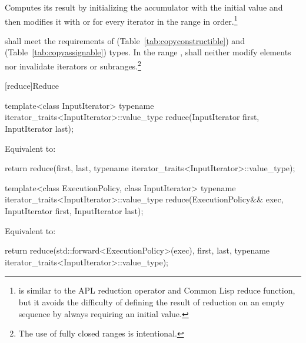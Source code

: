 \begin{itemdescr}
\pnum
\effects
Computes its result by initializing the accumulator
with the initial value
and then modifies it with
or
for every iterator
in the range 
in order.\footnote{
is similar to the APL reduction operator and Common Lisp reduce function, but
it avoids the difficulty of defining the result of reduction on an empty
sequence by always requiring an initial value.}

\pnum
\requires
{} shall meet the requirements of  (Table~\ref{tab:copyconstructible})
and  (Table~\ref{tab:copyassignable}) types.
In the range
,
shall neither modify elements nor invalidate iterators or subranges.\footnote{The use of fully closed ranges is intentional.}
\end{itemdescr}

[reduce]{Reduce}

%
\begin{itemdecl}
template<class InputIterator>
  typename iterator_traits<InputIterator>::value_type
    reduce(InputIterator first, InputIterator last);
\end{itemdecl}

\begin{itemdescr}
\pnum
\effects Equivalent to:
\begin{codeblock}
return reduce(first, last,
              typename iterator_traits<InputIterator>::value_type{});
\end{codeblock}
\end{itemdescr}

%
\begin{itemdecl}
template<class ExecutionPolicy, class InputIterator>
  typename iterator_traits<InputIterator>::value_type
    reduce(ExecutionPolicy&& exec,
           InputIterator first, InputIterator last);
\end{itemdecl}

\begin{itemdescr}
\pnum
\effects Equivalent to:
\begin{codeblock}
return reduce(std::forward<ExecutionPolicy>(exec), first, last,
              typename iterator_traits<InputIterator>::value_type{});
\end{codeblock}
\end{itemdescr}


